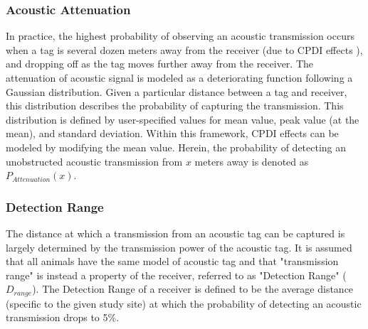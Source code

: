 \subsubsection{Acoustic Attenuation}
\label{acousticAttenuation}
In practice, the highest probability of observing an acoustic transmission occurs when a tag is several dozen meters away from the receiver (due to CPDI effects \cite{Kessel2015}), and dropping off as the tag moves further away from the receiver.  The attenuation of acoustic signal is modeled as a deteriorating function following a Gaussian distribution.  Given a particular distance between a tag and receiver, this distribution describes the probability of capturing the transmission.  This distribution is defined by user-specified values for mean value, peak value (at the mean),  and standard deviation.  Within this framework, CPDI effects can be modeled by modifying the mean value.  Herein, the probability of detecting an unobstructed acoustic transmission from $x$ meters away is denoted as $P_{Attenuation}(x)$.

\subsubsection{Detection Range}
\label{detectionRange}
The distance at which a transmission from an acoustic tag can be captured is largely determined by the transmission power of the acoustic tag.  It is assumed that all animals have the same model of acoustic tag and that "transmission range" is instead a property of the receiver, referred to as "Detection Range" ($D_{range}$).  The Detection Range of a receiver is defined to be the average distance (specific to the given study site) at which the probability of detecting an acoustic transmission drops to 5\%.

